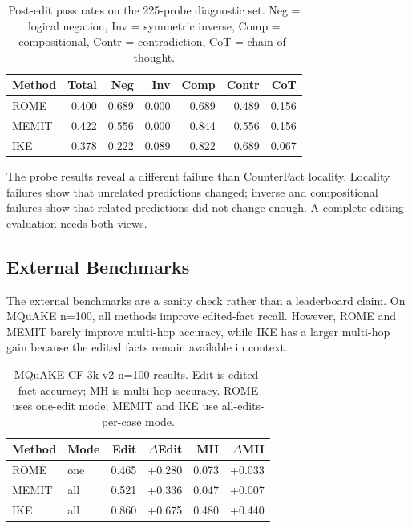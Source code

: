 \documentclass[11pt]{article}
\begin{document}
\begin{table}[!htbp]
\centering
\scriptsize
\setlength{\tabcolsep}{2.6pt}
\begin{tabular*}{\columnwidth}{@{\extracolsep{\fill}}lrrrrrr@{}}
\toprule
Method & Total & Neg & Inv & Comp & Contr & CoT \\
\midrule
ROME & 0.400 & 0.689 & 0.000 & 0.689 & 0.489 & 0.156 \\
MEMIT & 0.422 & 0.556 & 0.000 & 0.844 & 0.556 & 0.156 \\
IKE & 0.378 & 0.222 & 0.089 & 0.822 & 0.689 & 0.067 \\
\bottomrule
\end{tabular*}
\caption{Post-edit pass rates on the 225-probe diagnostic set. Neg = logical negation, Inv = symmetric inverse, Comp = compositional, Contr = contradiction, CoT = chain-of-thought.}
\label{tab:probes}
\end{table}

The probe results reveal a different failure than CounterFact locality. Locality failures show that unrelated predictions changed; inverse and compositional failures show that related predictions did not change enough. A complete editing evaluation needs both views.

\subsection{External Benchmarks}

The external benchmarks are a sanity check rather than a leaderboard claim. On MQuAKE n=100, all methods improve edited-fact recall. However, ROME and MEMIT barely improve multi-hop accuracy, while IKE has a larger multi-hop gain because the edited facts remain available in context.

\begin{table}[!htbp]
\centering
\small
\begin{tabular*}{\columnwidth}{@{\extracolsep{\fill}}llrrrr@{}}
\toprule
Method & Mode & Edit & $\Delta$Edit & MH & $\Delta$MH \\
\midrule
ROME & one & 0.465 & +0.280 & 0.073 & +0.033 \\
MEMIT & all & 0.521 & +0.336 & 0.047 & +0.007 \\
IKE & all & 0.860 & +0.675 & 0.480 & +0.440 \\
\bottomrule
\end{tabular*}
\caption{MQuAKE-CF-3k-v2 n=100 results. Edit is edited-fact accuracy; MH is multi-hop accuracy. ROME uses one-edit mode; MEMIT and IKE use all-edits-per-case mode.}
\label{tab:mquake}
\end{table}
\end{document}
